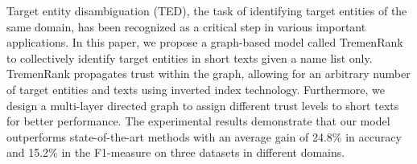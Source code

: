 Target entity disambiguation (TED), the task of identifying target entities of the same domain, has been recognized as a critical step in various important applications. In this paper, we propose a graph-based model called TremenRank to collectively identify target entities in short texts given a name list only. TremenRank propagates trust within the graph, allowing for an arbitrary number of target entities and texts using inverted index technology. Furthermore, we design a multi-layer directed graph to assign different trust levels to short texts for better performance. The experimental results demonstrate that our model outperforms state-of-the-art methods with an average gain of 24.8\% in accuracy and 15.2\% in the F1-measure on three datasets in different domains.
